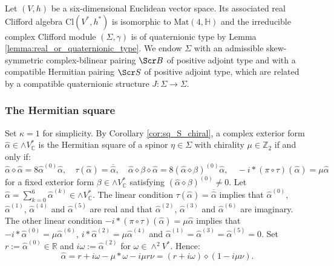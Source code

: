 \documentclass[10pt,a4paper,twoside,reqno]{amsart}
\theoremstyle{plain}
\theoremstyle{definition}
\theoremstyle{remark}
\newcommand{\Mat}{\mathrm{Mat}}
\def\Z{\mathbb{Z}}
\def\C{\mathbb{C}}
\def\R{\mathbb{R}}
\def\scB{\Scr B}
\def\scS{\Scr S}
\def\R{\mathbb{R}}
\begin{document}

Let $(V,h)$ be a six-dimensional Euclidean vector space. Its associated real Clifford algebra $\mathrm{Cl}(V^*,h^*)$ is isomorphic to $\Mat(4,\mathbb{H})$ and the irreducible complex Clifford module $(\Sigma,\gamma)$ is of quaternionic type by Lemma \ref{lemma:real_or_quaternionic_type}. We endow $\Sigma$ with an admissible skew-symmetric complex-bilinear pairing $\scB$ of positive adjoint type and with a compatible Hermitian pairing $\scS$ of positive adjoint type, which are related by a compatible quaternionic structure $J\colon\Sigma\to\Sigma$.


\subsubsection{The Hermitian square}


Set $\kappa=1$ for simplicity. By Corollary \ref{cor:sq_S_chiral}, a complex exterior form $\widehat{\alpha}\in\wedge V^*_\C$ is the Hermitian square of a spinor $\eta\in\Sigma$ with chirality $\mu\in\Z_2$ if and only if: $$\widehat{\alpha}\diamond\widehat{\alpha}=8\widehat{\alpha}^{(0)}\widehat{\alpha},\quad\tau(\widehat{\alpha})=\overline{\widehat{\alpha}},\quad\widehat{\alpha}\diamond\beta\diamond\widehat{\alpha}=8(\widehat{\alpha}\diamond\beta)^{(0)}\widehat{\alpha},\quad -i*(\pi\circ\tau)(\widehat{\alpha})=\mu\widehat{\alpha}$$ for a fixed exterior form $\beta\in\wedge V^*_\C$ satisfying $(\widehat{\alpha}\diamond\beta)^{(0)}\neq0$. Let $\widehat{\alpha}=\sum_{k=0}^6\widehat{\alpha}^{(k)}\in\wedge V^*_\C$. The linear condition $\tau(\widehat{\alpha})=\overline{\widehat{\alpha}}$ implies that $\widehat{\alpha}^{(0)}$, $\widehat{\alpha}^{(1)}$, $\widehat{\alpha}^{(4)}$ and $\widehat{\alpha}^{(5)}$ are real and that $\widehat{\alpha}^{(2)}$, $\widehat{\alpha}^{(3)}$ and $\widehat{\alpha}^{(6)}$ are imaginary. The other linear condition $-i*(\pi\circ\tau)(\widehat{\alpha})=\mu\widehat{\alpha}$ implies that $-i*\widehat{\alpha}^{(0)}=\mu\widehat{\alpha}^{(6)}$, $i*\widehat{\alpha}^{(2)}=\mu\widehat{\alpha}^{(4)}$ and $\widehat{\alpha}^{(1)}=\widehat{\alpha}^{(3)}=\widehat{\alpha}^{(5)}=0$. Set $r:=\widehat{\alpha}^{(0)}\in\R$ and $i\omega:=\widehat{\alpha}^{(2)}$ for $\omega\in\wedge^2V^*$. Hence:
\begin{equation*}
\widehat{\alpha}=r+i\omega-\mu*\omega-i\mu r\nu=(r+i\omega)\diamond(1-i\mu\nu).
\end{equation*}
\end{document}

